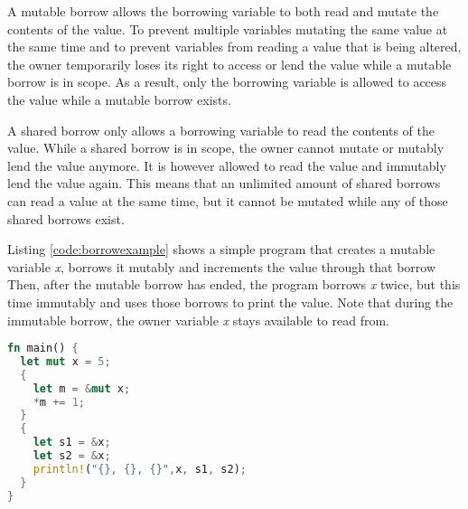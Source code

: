 A mutable borrow allows the borrowing variable to both read and mutate the contents of the value.
To prevent multiple variables mutating the same value at the same time and to prevent variables from reading a value that is being altered, the owner temporarily loses its right to access or lend the value while a mutable borrow is in scope.
As a result, only the borrowing variable is allowed to access the value while a mutable borrow exists. 

A shared borrow only allows a borrowing variable to read the contents of the value.
While a shared borrow is in scope, the owner cannot mutate or mutably lend the value anymore.
It is however allowed to read the value and immutably lend the value again.
This means that an unlimited amount of shared borrows can read a value at the same time, but it cannot be mutated while any of those shared borrows exist.

Listing \ref{code:borrowexample} shows a simple program that creates a mutable variable \textit{x}, borrows it mutably and increments the value through that borrow 
Then, after the mutable borrow has ended, the program borrows \textit{x} twice, but this time immutably and uses those borrows to print the value. Note that during the immutable borrow, the owner variable \textit{x} stays available to read from.

\begin{lstlisting}[language=Rust,frame=single,caption=Borrowing an integer,label=code:borrowexample]
fn main() {
  let mut x = 5;
  {
    let m = &mut x;
    *m += 1;
  }
  {
    let s1 = &x;
    let s2 = &x;
    println!("{}, {}, {}",x, s1, s2);
  }
}
\end{lstlisting}

